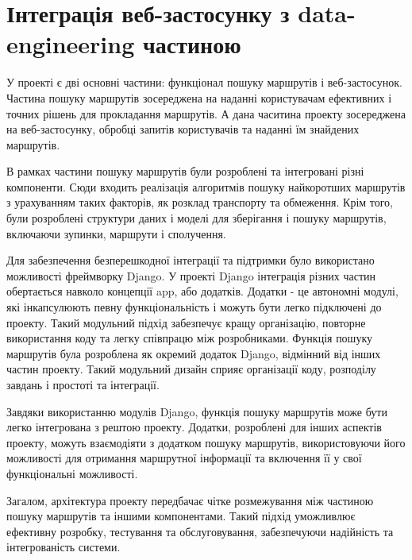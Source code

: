 \section{Інтеграція веб-застосунку з data-engineering частиною}
\label{sec:integration-design}

У проекті є дві основні частини: функціонал пошуку маршрутів і веб-застосунок. Частина пошуку маршрутів зосереджена на наданні користувачам ефективних і точних рішень для прокладання маршрутів. А дана часитина проекту зосереджена на веб-застосунку, обробці запитів користувачів та наданні їм знайдених маршрутів.

В рамках частини пошуку маршрутів були розроблені та інтегровані різні компоненти. Сюди входить реалізація алгоритмів пошуку найкоротших маршрутів з урахуванням таких факторів, як розклад транспорту та обмеження. Крім того, були розроблені структури даних і моделі для зберігання і пошуку маршрутів, включаючи зупинки, маршрути і сполучення.

Для забезпечення безперешкодної інтеграції та підтримки було використано можливості фреймворку Django. У проекті Django інтеграція різних частин обертається навколо концепції app, або додатків. Додатки - це автономні модулі, які інкапсулюють певну функціональність і можуть бути легко підключені до проекту. Такий модульний підхід забезпечує кращу організацію, повторне використання коду та легку співпрацю між розробниками. Функція пошуку маршрутів була розроблена як окремий додаток Django, відмінний від інших частин проекту. Такий модульний дизайн сприяє організації коду, розподілу завдань і простоті  та інтеграції.

Завдяки використанню модулів Django, функція пошуку маршрутів може бути легко інтегрована з рештою проекту. Додатки, розроблені для інших аспектів проекту, можуть взаємодіяти з додатком пошуку маршрутів, використовуючи його можливості для отримання маршрутної інформації та включення її у свої функціональні можливості.

Загалом, архітектура проекту передбачає чітке розмежування між частиною пошуку маршрутів та іншими компонентами. Такий підхід уможливлює ефективну розробку, тестування та обслуговування, забезпечуючи надійність та інтегрованість системи.

